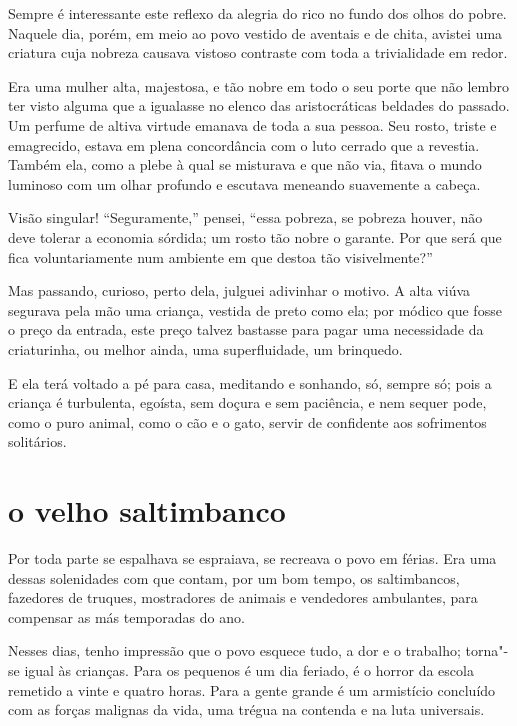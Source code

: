 Sempre é interessante este reflexo da alegria do rico no fundo dos
olhos do pobre. Naquele dia, porém, em meio ao povo vestido de aventais
e de chita, avistei uma criatura cuja nobreza causava vistoso contraste com
toda a trivialidade em redor.

Era uma mulher alta, majestosa, e tão nobre em todo o seu porte que não
lembro ter visto alguma que a igualasse no elenco das
aristocráticas beldades do passado. Um perfume de altiva virtude
emanava de toda a sua pessoa. Seu rosto, triste e emagrecido, estava em
plena concordância com o luto cerrado que a revestia. Também ela,
como a plebe à qual se misturava e que não via, fitava o mundo
luminoso com um olhar profundo e escutava meneando suavemente a
cabeça.

Visão singular! “Seguramente,'' pensei, “essa pobreza,
se pobreza houver, não deve tolerar a economia sórdida; um rosto tão
nobre o garante. Por que será que fica voluntariamente num ambiente em
que destoa tão visivelmente?''

Mas passando, curioso, perto dela, julguei adivinhar o motivo. A alta
viúva segurava pela mão uma criança, vestida de preto como ela; por
módico que fosse o preço da entrada, este preço talvez bastasse para
pagar uma necessidade da criaturinha, ou melhor ainda, uma
superfluidade, um brinquedo.

E ela terá voltado a pé para casa, meditando e sonhando, só, sempre só;
pois a criança é turbulenta, egoísta, sem doçura e sem paciência, e nem
sequer pode, como o puro animal, como o cão e o gato, servir de
confidente aos sofrimentos solitários.

\quebra\section[O velho saltimbanco]{o velho saltimbanco}

Por toda parte se espalhava se espraiava, se recreava o povo em férias.
Era uma dessas solenidades com que contam, por um bom tempo, os
saltimbancos, fazedores de truques, mostradores de animais e 
vendedores ambulantes, para compensar as más temporadas do ano.

Nesses dias, tenho impressão que o povo esquece tudo, a dor e o trabalho;
torna"-se igual às crianças. Para os pequenos é um dia feriado, é o
horror da escola remetido a vinte e quatro horas. Para a gente grande é
um armistício concluído com as forças malignas da vida, uma trégua na
contenda e na luta universais.

